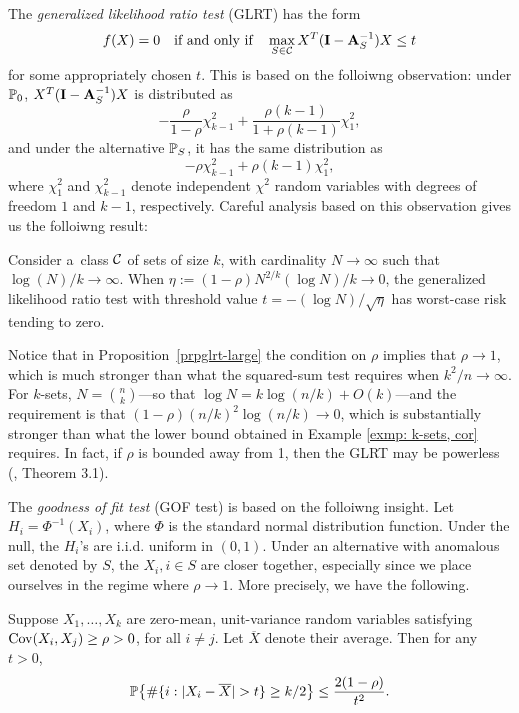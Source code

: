 \documentclass[10pt, oneside]{article}
\begin{document}
The \textit{generalized likelihood ratio test} (GLRT) has the form
%
\[
f(X)=0  \quad\mbox{if and only if}\quad
\max_{S \in{\mathcal C}} X^T (\mathbf{I}- \mathbf{A}_S^{-1}) X \leq t
\]
%
for some appropriately chosen $t$. This is based on the folloiwng observation:
under $\mathbb{P}_0$, $X^T (\mathbf{I}- \mathbf{A}_S^{-1}) X$ is distributed as
%
\[
- \frac{\rho}{1-\rho} \chi^2_{k-1} + \frac{\rho(k-1)}{1 + \rho(k-1)} \chi^2_1,
\]
%
and under the alternative $\mathbb{P}_S$, it has the same distribution as
%
\[
-\rho\chi^2_{k-1} + \rho(k-1) \chi^2_{1},
\]
%
where $\chi_1^2$ and $\chi_{k-1}^2$ denote independent $\chi^2$
random variables with degrees of freedom $1$ and $k-1$, respectively. Careful analysis based on this observation gives us the folloiwng result:

\begin{prop} \label{prpglrt-large}
Consider a~class ${\mathcal C}$ of sets of size $k$, with cardinality $N \to
\infty$ such that $\log(N)/k
\to\infty$. When $\eta:= (1-\rho) N^{2/k} (\log N)/k \to0$, the
generalized likelihood
ratio test with threshold value $t = -(\log N)/\sqrt{\eta}$ has
worst-case
risk tending to zero.
\end{prop}

Notice that in Proposition~\ref{prpglrt-large} the condition on $\rho
$ implies
that $\rho\to1$, which is much stronger than what the squared-sum
test requires when $k^2/n \to\infty$.
For $k$-sets, $N = {n \choose k}$---so that $\log N = k \log(n/k) +
O(k)$---and the requirement is that $(1-\rho) (n/k)^2 \log(n/k) \to
0$, which is substantially stronger than what the lower bound obtained
in Example \ref{exmp: k-sets, cor} requires. In fact, if $\rho$ is bounded away from 1, then the GLRT may be powerless (\cite{arias2012correlation}, Theorem 3.1).


The \textit{goodness of fit test} (GOF test) is based on the folloiwng insight.
Let $H_i = \Phi^{-1}(X_i)$, where $\Phi$ is the standard normal distribution
function. Under the null, the $H_i$'s are i.i.d. uniform in $(0,1)$.
Under an alternative with anomalous set denoted by $S$, the $X_i, i
\in S$ are closer together, especially since we place ourselves in the
regime where $\rho\to1$. More precisely, we have the following.
%
\begin{lem} \label{lemclose}
Suppose $X_1,\ldots, X_k$ are
zero-mean, unit-variance
random variables satisfying $\operatorname{Cov}(X_i, X_j) \geq\rho> 0$, for all $i
\neq j$. Let $\overline{X}$ denote their average. Then for any $t > 0$,
%
\[
\mathbb{P}\bigl\{ \# \{i: |X_i - \overline{X}| > t\} \geq k/2\bigr\}
\leq\frac{2(1-\rho)}{t^2}.
\]
%
\end{lem}
\end{document}

